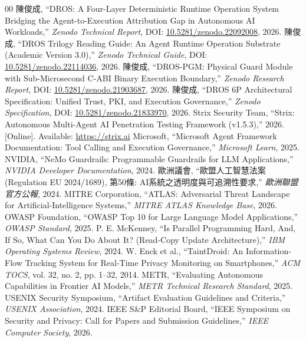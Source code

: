 \documentclass[conference]{IEEEtran}
\begin{document}
\begin{thebibliography}{00}
 陳俊成, ``DROS: A Four-Layer Deterministic Runtime Operation System Bridging the Agent-to-Execution Attribution Gap in Autonomous AI Workloads,'' \textit{Zenodo Technical Report}, DOI: \href{https://doi.org/10.5281/zenodo.22092008}{10.5281/zenodo.22092008}, 2026.
 陳俊成, ``DROS Trilogy Reading Guide: An Agent Runtime Operation Substrate (Academic Version 3.0),'' \textit{Zenodo Technical Guide}, DOI: \href{https://doi.org/10.5281/zenodo.22114036}{10.5281/zenodo.22114036}, 2026.
 陳俊成, ``DROS-PGM: Physical Guard Module with Sub-Microsecond C-ABI Binary Execution Boundary,'' \textit{Zenodo Research Report}, DOI: \href{https://doi.org/10.5281/zenodo.21903687}{10.5281/zenodo.21903687}, 2026.
 陳俊成, ``DROS 6P Architectural Specification: Unified Trust, PKI, and Execution Governance,'' \textit{Zenodo Specification}, DOI: \href{https://doi.org/10.5281/zenodo.21833970}{10.5281/zenodo.21833970}, 2026.
 Strix Security Team, ``Strix: Autonomous Multi-Agent AI Penetration Testing Framework (v1.5.3),'' 2026. [Online]. Available: \url{https://strix.ai}
 Microsoft, ``Microsoft Agent Framework Documentation: Tool Calling and Execution Governance,'' \textit{Microsoft Learn}, 2025.
 NVIDIA, ``NeMo Guardrails: Programmable Guardrails for LLM Applications,'' \textit{NVIDIA Developer Documentation}, 2024.
 歐洲議會, ``歐盟人工智慧法案 (Regulation EU 2024/1689), 第50條: AI系統之透明度與可追溯性要求,'' \textit{歐洲聯盟官方公報}, 2024.
 MITRE Corporation, ``ATLAS: Adversarial Threat Landscape for Artificial-Intelligence Systems,'' \textit{MITRE ATLAS Knowledge Base}, 2026.
 OWASP Foundation, ``OWASP Top 10 for Large Language Model Applications,'' \textit{OWASP Standard}, 2025.
 P. E. McKenney, ``Is Parallel Programming Hard, And, If So, What Can You Do About It? (Read-Copy Update Architecture),'' \textit{IBM Operating Systems Review}, 2024.
 W. Enck et al., ``TaintDroid: An Information-Flow Tracking System for Real-Time Privacy Monitoring on Smartphones,'' \textit{ACM TOCS}, vol. 32, no. 2, pp. 1--32, 2014.
 METR, ``Evaluating Autonomous Capabilities in Frontier AI Models,'' \textit{METR Technical Research Standard}, 2025.
 USENIX Security Symposium, ``Artifact Evaluation Guidelines and Criteria,'' \textit{USENIX Association}, 2024.
 IEEE S\&P Editorial Board, ``IEEE Symposium on Security and Privacy: Call for Papers and Submission Guidelines,'' \textit{IEEE Computer Society}, 2026.
\end{thebibliography}
\end{document}

